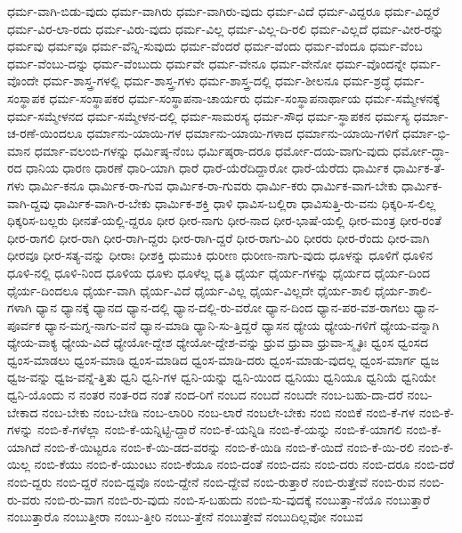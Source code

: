 {ಧರ್ಮ-ವಾಗಿ-ಬಿಡು-ವುದು
ಧರ್ಮ-ವಾಗಿರು
ಧರ್ಮ-ವಾಗಿರು-ವುದು
ಧರ್ಮ-ವಿದೆ
ಧರ್ಮ-ವಿದ್ದರೂ
ಧರ್ಮ-ವಿದ್ದರೆ
ಧರ್ಮ-ವಿರ-ಲಾ-ರದು
ಧರ್ಮ-ವಿರು-ವುದು
ಧರ್ಮ-ವಿಲ್ಲ
ಧರ್ಮ-ವಿಲ್ಲ-ದಿ-ರಲಿ
ಧರ್ಮ-ವಿಲ್ಲದೆ
ಧರ್ಮ-ವೀರ-ರನ್ನು
ಧರ್ಮವು
ಧರ್ಮವೂ
ಧರ್ಮ-ವೆನ್ನಿ-ಸುವುದು
ಧರ್ಮ-ವೆಂದರೆ
ಧರ್ಮ-ವೆಂದು
ಧರ್ಮ-ವೆಂದೂ
ಧರ್ಮ-ವೆಂಬ
ಧರ್ಮ-ವೆಂಬು-ದನ್ನು
ಧರ್ಮ-ವೆಂಬುದು
ಧರ್ಮವೇ
ಧರ್ಮ-ವೇನೂ
ಧರ್ಮ-ವೇನೋ
ಧರ್ಮ-ವೊಂದನ್ನೇ
ಧರ್ಮ-ವೊಂದೇ
ಧರ್ಮ-ಶಾಸ್ತ್ರ-ಗಳಲ್ಲಿ
ಧರ್ಮ-ಶಾಸ್ತ್ರ-ಗಳು
ಧರ್ಮ-ಶಾಸ್ತ್ರ-ದಲ್ಲಿ
ಧರ್ಮ-ಶೀಲನೂ
ಧರ್ಮ-ಶ್ರದ್ಧೆ
ಧರ್ಮ-ಸಂಸ್ಥಾಪಕ
ಧರ್ಮ-ಸಂಸ್ಥಾಪಕರ
ಧರ್ಮ-ಸಂಸ್ಥಾಪನಾ-ಚಾರ್ಯರು
ಧರ್ಮ-ಸಂಸ್ಥಾಪನಾರ್ಥಾಯ
ಧರ್ಮ-ಸಮ್ಮೇಳನಕ್ಕೆ
ಧರ್ಮ-ಸಮ್ಮೇಳನದ
ಧರ್ಮ-ಸಮ್ಮೇಳನ-ದಲ್ಲಿ
ಧರ್ಮ-ಸಾಮರಸ್ಯ
ಧರ್ಮ-ಸೌಧ
ಧರ್ಮ-ಸ್ಥಾಪಕನ
ಧರ್ಮಸ್ಯ
ಧರ್ಮಾ-ಚ-ರಣೆ-ಯಿಂದಲೂ
ಧರ್ಮಾನು-ಯಾಯಿ-ಗಳ
ಧರ್ಮಾನು-ಯಾಯಿ-ಗಳಾದ
ಧರ್ಮಾನು-ಯಾಯಿ-ಗಳಿಗೆ
ಧರ್ಮಾ-ಭಿ-ಮಾನ
ಧರ್ಮಾ-ವಲಂಬಿ-ಗಳನ್ನು
ಧರ್ಮಿಷ್ಠ-ನೆಂಬ
ಧರ್ಮಿಷ್ಠರಾ-ದರೂ
ಧರ್ಮೋ-ದಯ-ವಾಗು-ವುದು
ಧರ್ಮೋ-ದ್ಧಾ-ರದ
ಧಾನಿಯ
ಧಾರಣ
ಧಾರಣೆ
ಧಾರಿ-ಯಾಗಿ
ಧಾರೆ
ಧಾರೆ-ಯೆರೆದಿದ್ದಾರೋ
ಧಾರೆ-ಯೆರೆದು
ಧಾರ್ಮಿಕ
ಧಾರ್ಮಿಕ-ತೆ-ಗಳು
ಧಾರ್ಮಿ-ಕನೂ
ಧಾರ್ಮಿಕ-ರಾ-ಗುವ
ಧಾರ್ಮಿಕ-ರಾ-ಗುವರು
ಧಾರ್ಮಿ-ಕರು
ಧಾರ್ಮಿಕ-ವಾಗ-ಬೇಕು
ಧಾರ್ಮಿಕ-ವಾಗಿ-ದ್ದವು
ಧಾರ್ಮಿಕ-ವಾಗಿ-ರ-ಬೇಕು
ಧಾರ್ಮಿಕ-ಶಕ್ತಿ
ಧಾಳಿ
ಧಾವಿಸ-ಬಲ್ಲಿರಾ
ಧಾವಿಸುತ್ತಿ-ರು-ವನು
ಧಿಕ್ಕರಿ-ಸ-ಲಿಲ್ಲ
ಧಿಕ್ಕರಿಸ-ಬಲ್ಲರು
ಧೀನತೆ-ಯಲ್ಲಿ-ದ್ದರೂ
ಧೀರ
ಧೀರ-ನಾಗು
ಧೀರ-ನಾದ
ಧೀರ-ಭಾಷೆ-ಯಲ್ಲಿ
ಧೀರ-ಮಂತ್ರ
ಧೀರ-ರಂತೆ
ಧೀರ-ರಾಗಲಿ
ಧೀರ-ರಾಗಿ
ಧೀರ-ರಾಗಿ-ದ್ದರು
ಧೀರ-ರಾಗಿ-ದ್ದರೆ
ಧೀರ-ರಾಗು-ವಿರಿ
ಧೀರರು
ಧೀರ-ರೆಂದು
ಧೀರ-ವಾಗಿ
ಧೀರವೂ
ಧೀರ-ಸತ್ಯ-ವನ್ನು
ಧೀರಾಃ
ಧೀಶಕ್ತಿ
ಧುಮುಕಿ
ಧುರೀಣ
ಧುರೀಣ-ನಾಗು-ವುದು
ಧೂಳನ್ನು
ಧೂಳಿಗೆ
ಧೂಳಿನ
ಧೂಳಿ-ನಲ್ಲಿ
ಧೂಳಿ-ನಿಂದ
ಧೂಳಿಯ
ಧೂಳು
ಧೂಳೆಲ್ಲ
ಧೃತಿ
ಧೈರ್ಯ
ಧೈರ್ಯ-ಗಳನ್ನು
ಧೈರ್ಯದ
ಧೈರ್ಯ-ದಿಂದ
ಧೈರ್ಯ-ದಿಂದಲೂ
ಧೈರ್ಯ-ವಾಗಿ
ಧೈರ್ಯ-ವಿದೆ
ಧೈರ್ಯ-ವಿಲ್ಲ
ಧೈರ್ಯ-ವಿಲ್ಲದೇ
ಧೈರ್ಯ-ಶಾಲಿ
ಧೈರ್ಯ-ಶಾಲಿ-ಗಳಾಗಿ
ಧ್ಯಾನ
ಧ್ಯಾನಕ್ಕೆ
ಧ್ಯಾನದ
ಧ್ಯಾನ-ದಲ್ಲಿ
ಧ್ಯಾನ-ದಲ್ಲಿ-ರು-ವರೋ
ಧ್ಯಾನ-ದಿಂದ
ಧ್ಯಾನ-ಪರ-ವಶ-ರಾಗಲು
ಧ್ಯಾನ-ಪೂರ್ವಕ
ಧ್ಯಾನ-ಮಗ್ನ-ನಾಗು-ವನೆ
ಧ್ಯಾನ-ಮಾಡಿ
ಧ್ಯಾನಿ-ಸು-ತ್ತಿದ್ದರೆ
ಧ್ಯಾಸನ
ಧ್ಯೇಯ
ಧ್ಯೇಯ-ಗಳಿಗೆ
ಧ್ಯೇಯ-ವನ್ನಾಗಿ
ಧ್ಯೇಯ-ವಾಕ್ಯ
ಧ್ಯೇಯ-ವಿದೆ
ಧ್ಯೇಯೋ-ದ್ದೇಶ
ಧ್ಯೇಯೋ-ದ್ದೇಶ-ವನ್ನು
ಧ್ರುವ
ಧ್ರುವಾ
ಧ್ರುವಾ-ಸ್ಮೃತಿಃ
ಧ್ವಂಸ
ಧ್ವಂಸದ
ಧ್ವಂಸ-ಮಾಡಲು
ಧ್ವಂಸ-ಮಾಡಿ
ಧ್ವಂಸ-ಮಾಡಿದ
ಧ್ವಂಸ-ಮಾಡಿ-ದರು
ಧ್ವಂಸ-ಮಾಡು-ವುದಲ್ಲ
ಧ್ವಂಸ-ಮಾರ್ಗ
ಧ್ವಜ
ಧ್ವಜ-ವನ್ನು
ಧ್ವಜ-ವನ್ನೆ-ತ್ತಿತು
ಧ್ವನಿ
ಧ್ವನಿ-ಗಳ
ಧ್ವನಿ-ಯನ್ನು
ಧ್ವನಿ-ಯಿಂದ
ಧ್ವನಿಯು
ಧ್ವನಿಯೂ
ಧ್ವನಿಯೆ
ಧ್ವನಿಯೇ
ಧ್ವನಿ-ಯೊಂದು
ನ
ನಂತರ
ನಂತ-ರದ
ನಂತೆ
ನಂದ-ರಿಗೆ
ನಂಬದ
ನಂಬದೆ
ನಂಬದೇ
ನಂಬ-ಬಹು-ದಾ-ದರೆ
ನಂಬ-ಬೇಕಾದ
ನಂಬ-ಬೇಕು
ನಂಬ-ಬೇಡಿ
ನಂಬ-ಲಾರಿರಿ
ನಂಬ-ಲಾರೆ
ನಂಬಲೇ-ಬೇಕು
ನಂಬಿ
ನಂಬಿಕೆ
ನಂಬಿ-ಕೆ-ಗಳ
ನಂಬಿ-ಕೆ-ಗಳನ್ನು
ನಂಬಿ-ಕೆ-ಗಳೆಲ್ಲಾ
ನಂಬಿ-ಕೆ-ಯನ್ನಿಟ್ಟಿ-ದ್ದಾರೆ
ನಂಬಿ-ಕೆ-ಯನ್ನಿಡಿ
ನಂಬಿ-ಕೆ-ಯನ್ನು
ನಂಬಿ-ಕೆ-ಯಾಗಲಿ
ನಂಬಿ-ಕೆ-ಯಾಗಿದೆ
ನಂಬಿ-ಕೆ-ಯಿಟ್ಟರೂ
ನಂಬಿ-ಕೆ-ಯಿ-ಡದ-ವರನ್ನು
ನಂಬಿ-ಕೆ-ಯಿಡಿ
ನಂಬಿ-ಕೆ-ಯಿದೆ
ನಂಬಿ-ಕೆ-ಯಿ-ರಲಿ
ನಂಬಿ-ಕೆ-ಯಿಲ್ಲ
ನಂಬಿ-ಕೆಯು
ನಂಬಿ-ಕೆ-ಯುಂಟು
ನಂಬಿ-ಕೆಯೂ
ನಂಬಿ-ದಂತೆ
ನಂಬಿ-ದನು
ನಂಬಿ-ದರು
ನಂಬಿ-ದರೂ
ನಂಬಿ-ದರೆ
ನಂಬಿ-ದ್ದರು
ನಂಬಿ-ದ್ದರೆ
ನಂಬಿ-ದ್ದವೊ
ನಂಬಿ-ದ್ದೇನೆ
ನಂಬಿ-ದ್ದೇವೆ
ನಂಬಿ-ರುತ್ತಾರೆ
ನಂಬಿ-ರುತ್ತೇವೆ
ನಂಬಿ-ರುವ
ನಂಬಿ-ರು-ವರು
ನಂಬಿ-ರು-ವಾಗ
ನಂಬಿ-ರು-ವುದು
ನಂಬಿ-ಸ-ಬಹುದು
ನಂಬಿ-ಸು-ವುದಕ್ಕೆ
ನಂಬುತ್ತಾ-ನೆಯೊ
ನಂಬುತ್ತಾರೆ
ನಂಬುತ್ತಾರೊ
ನಂಬುತ್ತೀರಾ
ನಂಬು-ತ್ತೀರಿ
ನಂಬು-ತ್ತೇನೆ
ನಂಬುತ್ತೇವೆ
ನಂಬುದಿಲ್ಲವೋ
ನಂಬುವ
}
